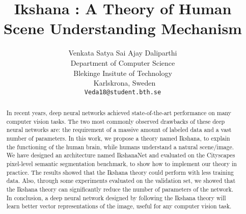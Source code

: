 \documentclass{article}
\title{Ikshana : A Theory of Human Scene Understanding Mechanism}
\author{
  Venkata Satya Sai Ajay Daliparthi \\
  Department of Computer Science\\
  Blekinge Insitute of Technology\\\
  Karlskrona, Sweden \\
  \texttt{Veda18@student.bth.se} \\


}
\begin{document}
\maketitle

\begin{abstract}
In recent years, deep neural networks achieved state-of-the-art performance on many computer vision tasks. The two most commonly observed drawbacks of these deep neural networks are: the requirement of a massive amount of labeled data and a vast number of parameters. In this work, we propose a theory named Ikshana, to explain the functioning of the human brain, while humans understand a natural scene/image. We have designed an architecture named IkshanaNet and evaluated on the Cityscapes pixel-level semantic segmentation benchmark, to show how to implement our theory in practice. The results showed that the Ikshana theory could perform with less training data. Also, through some experiments evaluated on the validation set, we showed that the Ikshana theory can significantly reduce the number of parameters of the network. In conclusion, a deep neural network designed by following the Ikshana theory will learn better vector representations of the image, useful for any computer vision task.
\end{abstract}
\end{document}
